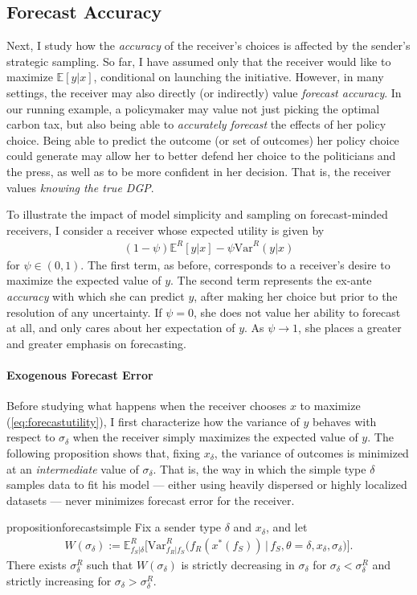 \documentclass[11pt,dvipsnames]{article}
\newcommand{\Var}{\mathrm{Var}}
\begin{document}
\subsection{Forecast Accuracy}\label{section:forecast}
Next, I study how the \emph{accuracy} of the receiver's choices is affected by the sender's strategic sampling.
So far, I have assumed only that the receiver would like to maximize $\mathbb{E}[y|x]$, conditional on launching the initiative.
However, in many settings, the receiver may also directly (or indirectly) value \emph{forecast accuracy}.
In our running example, a policymaker may value not just picking the optimal carbon tax, but also being able to \emph{accurately forecast} the effects of her policy choice.
Being able to predict the outcome (or set of outcomes) her policy choice could generate may allow her to better defend her choice to the politicians and the press, as well as to be more confident in her decision.
That is, the receiver values \emph{knowing the true DGP}.

To illustrate the impact of model simplicity and sampling on forecast-minded receivers, I consider a receiver whose expected utility is given by
\begin{align}
(1-\psi)\mathbb{E}^R[y|x]-\psi \Var^R(y|x)	
\label{eq:forecastutility}
\end{align}
for $\psi \in (0,1)$.
The first term, as before, corresponds to a receiver's desire to maximize the expected value of $y$.
The second term represents the ex-ante \emph{accuracy} with which she can predict $y$, after making her choice but prior to the resolution of any uncertainty.
If $\psi = 0$, she does not value her ability to forecast at all, and only cares about her expectation of $y$.
As $\psi \to 1$, she places a greater and greater emphasis on forecasting.

\paragraph{Exogenous Forecast Error}
Before studying what happens when the receiver chooses $x$ to maximize (\ref{eq:forecastutility}), I first characterize how the variance of $y$ behaves with respect to $\sigma_\delta$ when the receiver simply maximizes the expected value of $y$.
The following proposition shows that, fixing $x_\delta$, the variance of outcomes is minimized at an \emph{intermediate} value of $\sigma_\delta$.
That is, the way in which the simple type $\delta$ samples data to fit his model --- either using heavily dispersed or highly localized datasets --- never minimizes forecast error for the receiver.
\begin{restatable}{proposition}{forecastsimple}
Fix a sender type $\delta$ and $x_\delta$, and let
\begin{align*}
W(\sigma_\delta) := \mathbb{E}_{f_S|\delta}^R\Big[\Var_{f_R|f_S}^R\big(f_R(x^*(f_S))\,\big|\,f_S,\theta=\delta,x_\delta,\sigma_\delta\big)\Big].
\end{align*}
There exists $\sigma_\delta^R$ such that $W(\sigma_\delta)$ is strictly decreasing in $\sigma_\delta$ for $\sigma_\delta<\sigma_\delta^R$ and strictly increasing for $\sigma_\delta>\sigma_\delta^R$.
\label{prop:forecastsimple}
\end{restatable}
\end{document}
